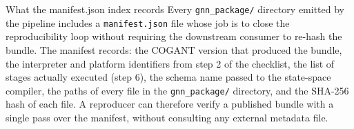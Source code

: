 \documentclass[
  ignorenonframetext,
]{beamer}
\begin{document}
\begin{frame}[fragile]{What the manifest.json index records}
\protect{}\label{what-the-manifest.json-index-records}
Every \texttt{gnn\_package/} directory emitted by the pipeline includes
a \texttt{manifest.json} file whose job is to close the reproducibility
loop without requiring the downstream consumer to re-hash the bundle.
The manifest records: the COGANT version that produced the bundle, the
interpreter and platform identifiers from step 2 of the checklist, the
list of stages actually executed (step 6), the schema name passed to the
state-space compiler, the paths of every file in the
\texttt{gnn\_package/} directory, and the SHA-256 hash of each file. A
reproducer can therefore verify a published bundle with a single pass
over the manifest, without consulting any external metadata file.
\end{frame}
\end{document}
